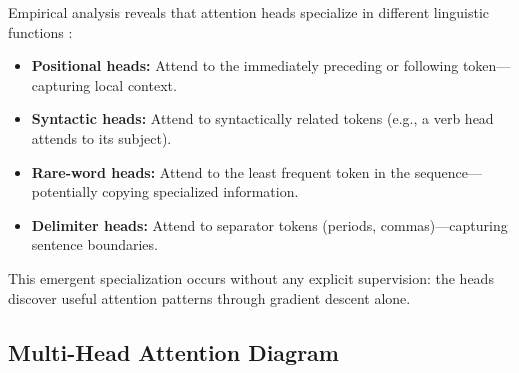 Empirical analysis reveals that attention heads specialize in different linguistic functions \citep{voita2019}:

\begin{itemize}[leftmargin=1.5em]
  \item \textbf{Positional heads:} Attend to the immediately preceding or following token---capturing local context.
  \item \textbf{Syntactic heads:} Attend to syntactically related tokens (e.g., a verb head attends to its subject).
  \item \textbf{Rare-word heads:} Attend to the least frequent token in the sequence---potentially copying specialized information.
  \item \textbf{Delimiter heads:} Attend to separator tokens (periods, commas)---capturing sentence boundaries.
\end{itemize}

This emergent specialization occurs without any explicit supervision: the heads discover useful attention patterns through gradient descent alone.

\subsection{Multi-Head Attention Diagram}

